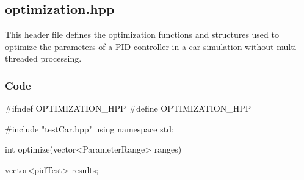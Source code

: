 \documentclass[a4paper,12pt]{report}
\begin{document}
\begin{lstlising}[language=C++]
\subsection{optimization.hpp}
This header file defines the optimization functions and structures used to optimize the parameters of a PID controller in a car simulation without multi-threaded processing.
\subsubsection{Code}
\begin{lstlising}[language=C++]
#ifndef OPTIMIZATION_HPP
#define OPTIMIZATION_HPP

#include "testCar.hpp"
using namespace std;

int optimize(vector<ParameterRange> ranges)
{
    vector<pidTest> results;

}
\end{lstlising}
\end{lstlising}
\end{document}
